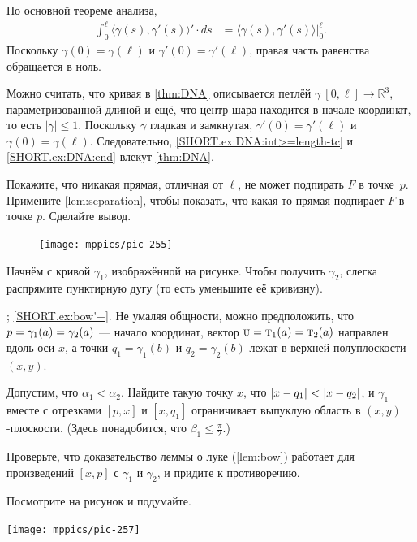 \begin{multicols}{2}
По основной теореме анализа,
\begin{align*}
\int_0^\ell\langle\gamma(s),\gamma'(s)\rangle'\cdot ds
&=\langle\gamma(s),\gamma'(s)\rangle\bigg|_0^\ell.
\end{align*}
Поскольку $\gamma(0)=\gamma(\ell)$ и $\gamma'(0)=\gamma'(\ell)$, правая часть равенства обращается в ноль.

Можно считать, что кривая в \ref{thm:DNA} описывается петлёй $\gamma\:[0,\ell]\to\mathbb{R}^3$, параметризованной длиной и ещё, что центр шара находится в начале координат, то есть $|\gamma|\le 1$.
Поскольку $\gamma$ гладкая и замкнутая, 
$\gamma'(0)=\gamma'(\ell)$ и $\gamma(0)=\gamma(\ell)$.
Следовательно, \ref{SHORT.ex:DNA:int>=length-tc} и \ref{SHORT.ex:DNA:end} влекут \ref{thm:DNA}.

Покажите, что никакая прямая, отличная от $\ell$, не может подпирать $F$ в точке~$p$. 
Примените \ref{lem:separation}, чтобы показать, что какая-то прямая подпирает $F$ в точке $p$.
Сделайте вывод.

{

\begin{figure}
\vskip-6mm
\centering
\texttt{[image: mppics/pic-255]}
\vskip0mm
\end{figure}

Начнём с кривой $\gamma_1$, изображённой на рисунке.
Чтобы получить $\gamma_2$, слегка распрямите пунктирную дугу (то есть уменьшите её кривизну).

}

\parbf{\ref{ex:bow'}}; \ref{SHORT.ex:bow'+}.
Не умаляя общности, можно предположить, что $p=\gamma_1(a)\z=\gamma_2(a)$ --- начало координат, 
вектор $\vec u=\tan_1(a)\z=\tan_2(a)$ направлен вдоль оси $x$,
а точки $q_1=\gamma_1(b)$ и $q_2=\gamma_2(b)$ лежат в верхней полуплоскости $(x,y)$.

Допустим, что $\alpha_1<\alpha_2$.
Найдите такую точку $x$, что
$\dist{x}{q_1}{}<\dist{x}{q_2}{}$, и
$\gamma_1$ вместе с отрезками $[p,x]$ и $[x,q_1]$ ограничивает выпуклую область в $(x,y)$-плоскости.
(Здесь понадобится, что $\beta_1\le\tfrac\pi2$.)

Проверьте, что доказательство леммы о луке (\ref{lem:bow}) работает для произведений $[x,p]$ с $\gamma_1$ и $\gamma_2$, и придите к противоречию.

Посмотрите на рисунок и подумайте.

\begin{Figure}
\vskip-0mm
\centering
\texttt{[image: mppics/pic-257]}
\vskip0mm
\end{Figure}


\end{multicols}
